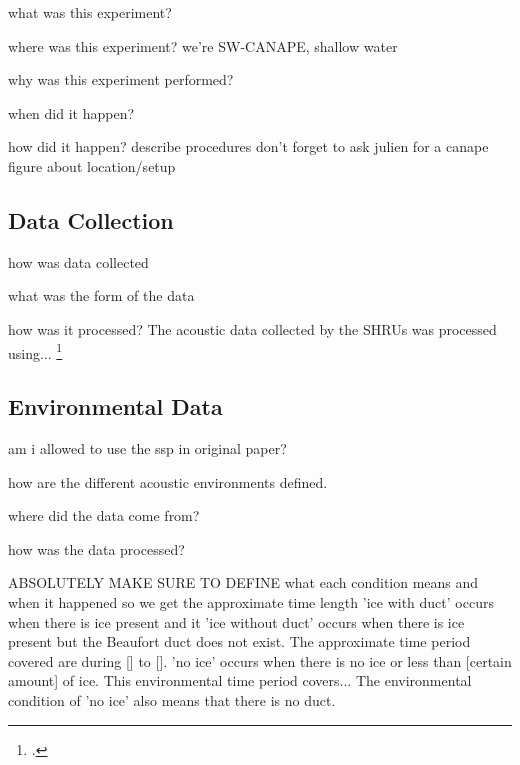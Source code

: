 what was this experiment?

where was this experiment?
we're SW-CANAPE, shallow water

why was this experiment performed?

when did it happen?

how did it happen? describe procedures
don't forget to ask julien for a canape figure about location/setup


\subsection{Data Collection} \label{intro_data_col}

how was data collected

what was the form of the data

how was it processed?
The acoustic data collected by the SHRUs was processed using...
\footcite[]{Bonnel2021}

\subsection{Environmental Data} \label{intro_env_info}
am i allowed to use the ssp in original paper?


how are the different acoustic environments defined.

where did the data come from?

how was the data processed?

ABSOLUTELY MAKE SURE TO DEFINE what each condition means and when it happened so we get the approximate time length
'ice with duct' occurs when there is ice present and it 
'ice without duct' occurs when there is ice present but the Beaufort duct does not exist. The approximate time period covered  are during [] to [].                                                                                            
'no ice' occurs when there is no ice or less than [certain amount] of ice. This environmental time period covers...
The environmental condition of 'no ice' also means that there is no duct.
